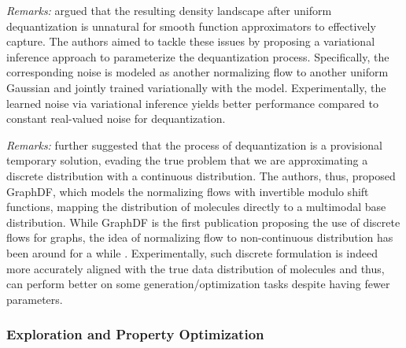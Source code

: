 \textit{Remarks:} \citep{hoFlowImprovingFlowBased2019} argued that the resulting
density landscape after uniform dequantization is unnatural for smooth function
approximators to effectively capture. The authors aimed to tackle these issues
by proposing a variational inference approach to parameterize the dequantization
process. Specifically, the corresponding noise is modeled as another normalizing
flow to another uniform Gaussian and jointly trained variationally with the
model. Experimentally, the learned noise via variational inference yields better
performance compared to constant real-valued noise for dequantization.

\textit{Remarks:} \citep{luoGraphDFDiscreteFlow2021} further suggested that the
process of dequantization is a provisional temporary solution, evading the true
problem that we are approximating a discrete distribution with a continuous
distribution. The authors, thus, proposed GraphDF, which models the normalizing
flows with invertible modulo shift functions, mapping the distribution of
molecules directly to a multimodal base distribution. While GraphDF is the first
publication proposing the use of discrete flows for graphs, the idea of
normalizing flow to non-continuous distribution has been around for a while
\citep{lippeCategoricalNormalizingFlows2021, tranDiscreteFlowsInvertible2019}.
Experimentally, such discrete formulation is indeed more accurately aligned with
the true data distribution of molecules and thus, can perform better on some
generation/optimization tasks despite having fewer parameters.

\subsubsection{Exploration and Property Optimization}

